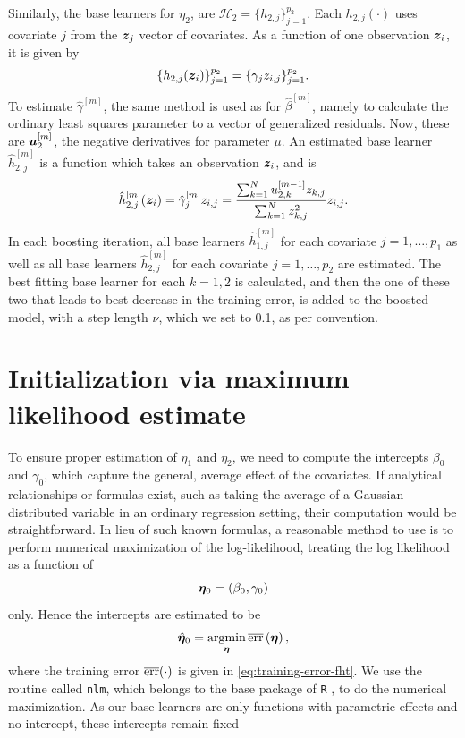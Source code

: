 Similarly, the base learners for $\eta_2$, are $\mathcal{H}_2=\{h_{2,j}\}_{j=1}^{p_2}$.
Each $h_{2,j}(\cdot)$ uses covariate $j$ from the $\bm{z}_j$ vector of covariates.
As a function of one observation $\bm{z}_i$, it is given by
\begin{equation*}
    \{h_{2,j}(\bm{z}_i)\}_{j=1}^{p_2}=\{\gamma_jz_{i,j}\}_{j=1}^{p_2}.
\end{equation*}
To estimate $\hat{\gamma}^{[m]}$, the same method is used as for $\hat{\beta}^{[m]}$, namely to calculate the ordinary least squares parameter to a vector of generalized residuals.
Now, these are $\bm{u}_2^{[m]}$, the negative derivatives for parameter $\mu$.
An estimated base learner $\hat{h}_{2,j}^{[m]}$ is a function which takes an observation $\bm{z}_i$, and is
\begin{equation*}
    \hat{h}_{2,j}^{[m]}(\bm{z}_i)=\hat{\gamma}^{[m]}_jz_{i,j}=\frac{\sum_{k=1}^N u_{2,k}^{[m-1]}z_{k,j}}{\sum_{k=1}^N z_{k,j}^2}z_{i,j}.
\end{equation*}
In each boosting iteration, all base learners $\hat{h}_{1,j}^{[m]}$ for each covariate $j=1,\ldots,p_1$ as well as all base learners $\hat{h}_{2,j}^{[m]}$ for each covariate $j=1,\ldots,p_2$ are estimated.
The best fitting base learner for each $k=1,2$ is calculated, and then the one of these two that leads to best decrease in the training error, is added to the boosted model, with a step length $\nu$, which we set to 0.1, as per convention.

\section{Initialization via maximum likelihood estimate}
To ensure proper estimation of $\eta_1$ and $\eta_2$, we need to compute the intercepts $\beta_{0}$ and $\gamma_{0}$, which capture the general, average effect of the covariates.
If analytical relationships or formulas exist, such as taking the average of a Gaussian distributed variable in an ordinary regression setting, their computation would be straightforward.
In lieu of such known formulas, a reasonable method to use is to perform numerical maximization of the log-likelihood, treating the log likelihood as a function of
\begin{equation*}
    \boldsymbol{\eta}_0=\left(\beta_{0},\gamma_{0}\right)
\end{equation*}
only.
Hence the intercepts are estimated to be
\begin{equation*}
    \hat{\boldsymbol{\eta}}_0=\operatorname*{argmin}_{\boldsymbol{\eta}}\overline{\text{err}}\left(\boldsymbol{\eta}\right),
\end{equation*}
where the training error $\overline{\text{err}}(\cdot)$ is given in \ref{eq:training-error-fht}.
We use the routine called \verb|nlm|, which belongs to the base package of \verb|R| \citep{Rlang}, to do the numerical maximization.
As our base learners are only functions with parametric effects and no intercept, these intercepts remain fixed

